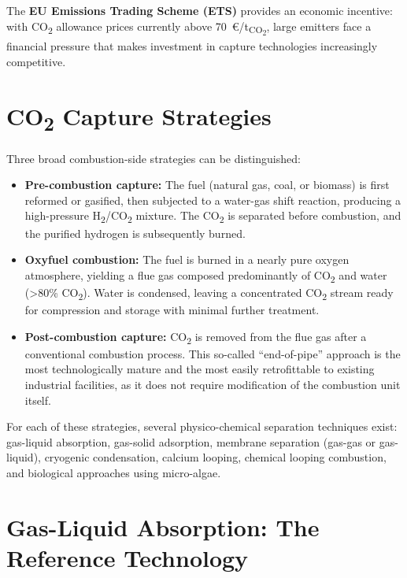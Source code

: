 The \textbf{EU Emissions Trading Scheme (ETS)} provides an economic incentive: with 
CO\textsubscript{2} allowance prices currently above 70~\euro/t\textsubscript{CO\textsubscript{2}}, 
large emitters face a financial pressure that makes investment in capture technologies 
increasingly competitive.

\section{CO\texorpdfstring{\textsubscript{2}}{2} Capture Strategies}

Three broad combustion-side strategies can be distinguished:

\begin{itemize}
    \item \textbf{Pre-combustion capture:} The fuel (natural gas, coal, or biomass) is 
    first reformed or gasified, then subjected to a water-gas shift reaction, producing 
    a high-pressure H\textsubscript{2}/CO\textsubscript{2} mixture. The CO\textsubscript{2} 
    is separated before combustion, and the purified hydrogen is subsequently burned.
    
    \item \textbf{Oxyfuel combustion:} The fuel is burned in a nearly pure oxygen 
    atmosphere, yielding a flue gas composed predominantly of CO\textsubscript{2} and 
    water (>80\% CO\textsubscript{2}). Water is condensed, leaving a concentrated 
    CO\textsubscript{2} stream ready for compression and storage with minimal further 
    treatment.
    
    \item \textbf{Post-combustion capture:} CO\textsubscript{2} is removed from the 
    flue gas after a conventional combustion process. This so-called ``end-of-pipe'' 
    approach is the most technologically mature and the most easily retrofittable to 
    existing industrial facilities, as it does not require modification of the 
    combustion unit itself.
\end{itemize}

For each of these strategies, several physico-chemical separation techniques exist: 
gas-liquid absorption, gas-solid adsorption, membrane separation (gas-gas or 
gas-liquid), cryogenic condensation, calcium looping, chemical looping combustion, 
and biological approaches using micro-algae.

\section{Gas-Liquid Absorption: The Reference Technology}

